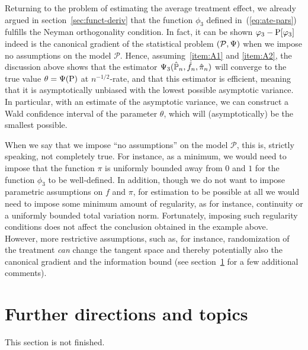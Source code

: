 \documentclass[a4,danish]{article}
\begin{document}
\begin{example}
  \label{example:effi-ate}
  Returning to the problem of estimating the average treatment effect, we already argued in
  section~\ref{sec:funct-deriv} that the function $\phi_3$ defined in~(\ref{eq:ate-pars}) fulfills
  the Neyman orthogonality condition. In fact, it can be shown $\phi_3 - \P[\phi_3]$ indeed is the
  canonical gradient of the statistical problem $(\mathcal{P}, \TT)$ when we impose no assumptions
  on the model $\mathcal{P}$. Hence, assuming~\ref{item:A1} and \ref{item:A2}, the discussion above
  shows that the estimator $\TT_3(\empmeas, \hat{f}_n, \hat{\pi}_n)$ will converge to the true value
  $\theta=\TT(\P)$ at $n^{-1/2}$-rate, and that this estimator is efficient, meaning that it is
  asymptotically unbiased with the lowest possible asymptotic variance. In particular, with an
  estimate of the asymptotic variance, we can construct a Wald confidence interval of the parameter
  $\theta$, which will (asymptotically) be the smallest possible. 
\end{example}

\begin{remark}
  When we say that we impose ``no assumptions'' on the model $\mathcal{P}$, this is, strictly
  speaking, not completely true. For instance, as a minimum, we would need to impose that the
  function $\pi$ is uniformly bounded away from $0$ and $1$ for the function $\phi_3$ to be
  well-defined. In addition, though we do not want to impose parametric assumptions on $f$ and
  $\pi$, for estimation to be possible at all we would need to impose some minimum amount of
  regularity, as for instance, continuity or a uniformly bounded total variation norm. Fortunately,
  imposing such regularity conditions does not affect the conclusion obtained in the example above.
  However, more restrictive assumptions, such as, for instance, randomization of the treatment
  \textit{can} change the tangent space and thereby potentially also the canonical gradient and the
  information bound (see section~\ref{sec:further-directions} for a few additional comments).
\end{remark}

\section{Further directions and topics}
\label{sec:further-directions}

This section is not finished. 
\end{document}
